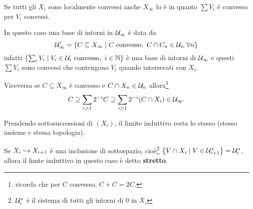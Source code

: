 \begin{remark}\label{ReLimiteInduttivoSVTLC}
Se tutti gli $X_i$ sono localmente convessi anche $X_\infty$ lo \`e in quanto $\sum V_i$ \`e convesso per $V_i$ convessi. 

In questo caso una base di intorni in $\mathcal{U}_\infty$ \`e data da
\[\mathcal{U}_\infty'=\left\{{C\subseteq X_\infty\mid C\text{ convesso},\ C\cap C_n\in \mathcal{U}_n\ \forall n}\right\}\]
infatti $\cpa{\sum_i V_i\mid V_i\in\Uc_i\text{ convesso},\ i\in\N}$ \`e una base di intorni di $\mathcal{U}_\infty$ e questi $\sum V_i$ sono convessi che contengono $V_i$ quando intersecati con $X_i$.

Viceversa se $C\subseteq X_\infty$ \`e convesso e $C\cap X_n\in\mathcal{U}_n$ allora\footnote{ricorda che per $C$ convesso, $C+C=2C$.}
\[C\supseteq \sum_{i\geq 1}2^{-i}C\supseteq\sum_{i\geq 1}2^{-i}(C\cap X_i)\in \mathcal{U}_\infty.\]
\end{remark}

\begin{remark}
Prendendo sottosuccessioni di $(X_i)$, il limite induttivo resta lo stesso (stesso insieme e stessa topologia).
\end{remark}

\begin{definition}
Se $X_i\hookrightarrow X_{i+1}$ \`e una inclusione di sottospazio, cio\`e\footnote{$\mathcal{U}_i^\ast$ \`e il sistema di tutti gli intorni di 0 in $X_i$} $\left\{{V\cap X_{i}\mid V\in \mathcal{U}_{i+1}^\ast}\right\}=\mathcal{U}_{i}^\ast$, allora il limte induttivo in questo caso \`e detto \textbf{stretto}.
\end{definition}

